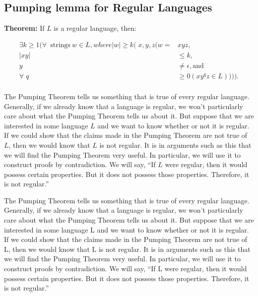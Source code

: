 \documentclass{article}
\begin{document}
\subsection{Pumping lemma for Regular Languages }

\textbf{Theorem:} If $L$ is a regular language, then: 

\begin{align*}
		\exists k \ge 1 ( \forall \>\text{strings} \> w \in L, where |w| \ge k (x, y, z (w = &xyz, \\
		 |xy| &\le k, \\
		 y &\ne \epsilon, \text{and} \\
		\forallq &\ge 0 (xy^{q}z \in L)))). \\
\end{align*}
 
The Pumping Theorem tells us something that is true of every regular language.
Generally, if we already know that a language is regular, we won’t particularly
care about what the Pumping Theorem tells us about it.  But suppose that we are
interested in some language $L$ and we want to know whether or not it is regular.
If we could show that the claims made in the Pumping Theorem are not true of $L$,
then we would know that $L$ is not regular.  It is in arguments such as this that
we will find the Pumping Theorem very useful.  In particular, we will use it to
construct proofs by contradiction.  We will say, “If $L$ were regular, then it
would possess certain properties.  But it does not possess those properties.
Therefore, it is not regular.” 


The Pumping Theorem tells us something that is true of every regular language.
Generally, if we already know that a language is regular, we won’t particularly
care about what the Pumping Theorem tells us about it. But suppose that we are
interested in some language L and we want to know whether or not it is regular.
If we could show that the claims made in the Pumping Theorem are not true of L,
then we would know that L is not regular. It is in arguments such as this that
we will find the Pumping Theorem very useful. In particular, we will use it to
construct proofs by contradiction. We will say, “If L were regular, then it
would possess certain properties. But it does not possess those properties.
Therefore, it is not regular.”
\end{document}
